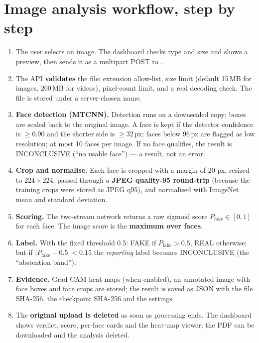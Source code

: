 \documentclass[11pt,a4paper]{report}
\newcommand{\code}[1]{\texttt{\detokenize{#1}}}
\newcommand{\pfake}{\ensuremath{P_{\mathrm{fake}}}}
\begin{document}
\section{Image analysis workflow, step by step}
\begin{enumerate}
\item The user selects an image. The dashboard checks type and size and shows a preview, then sends it as a multipart POST to \code{/api/analyze/image}.
\item The API \textbf{validates} the file: extension allow-list, size limit (default 15\,MB for images, 200\,MB for videos), pixel-count limit, and a real decoding check. The file is stored under a server-chosen name.
\item \textbf{Face detection (MTCNN).} Detection runs on a downscaled copy; boxes are scaled back to the original image. A face is kept if the detector confidence is $\ge 0.90$ and the shorter side is $\ge 32$\,px; faces below 96\,px are flagged as low resolution; at most 10 faces per image. If no face qualifies, the result is INCONCLUSIVE (``no usable face'') --- a result, not an error.
\item \textbf{Crop and normalise.} Each face is cropped with a margin of 20 px, resized to $224\times224$, passed through a \textbf{JPEG quality-95 round-trip} (because the training crops were stored as JPEG q95), and normalised with ImageNet mean and standard deviation.
\item \textbf{Scoring.} The two-stream network returns a raw sigmoid score $\pfake\in[0,1]$ for each face. The image score is the \textbf{maximum over faces}.
\item \textbf{Label.} With the fixed threshold 0.5: FAKE if $\pfake>0.5$, REAL otherwise; but if $|\pfake-0.5|<0.15$ the \emph{reporting} label becomes INCONCLUSIVE (the ``abstention band'').
\item \textbf{Evidence.} Grad-CAM heat-maps (when enabled), an annotated image with face boxes and face crops are stored; the result is saved as JSON with the file SHA-256, the checkpoint SHA-256 and the settings.
\item The \textbf{original upload is deleted} as soon as processing ends. The dashboard shows verdict, score, per-face cards and the heat-map viewer; the PDF can be downloaded and the analysis deleted.
\end{enumerate}
\end{document}
